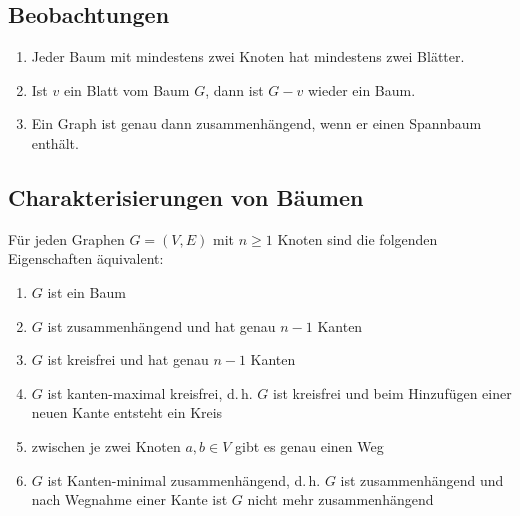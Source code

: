 \documentclass[%
a4paper, %
9pt,              %
leqno,            %
fleqn,            %
]
{scrartcl}
\begin{document}
\subsection*{Beobachtungen} %
\label{sub:Beobachtungen}

\begin{enumerate}
  \item Jeder Baum mit mindestens zwei Knoten hat mindestens zwei Blätter.
  \item Ist $v$ ein Blatt vom Baum $G$, dann ist $G-v$ wieder ein Baum.
  \item Ein Graph ist genau dann zusammenhängend, wenn er einen Spannbaum
    enthält.
\end{enumerate}


\subsection*{Charakterisierungen von Bäumen} %
\label{sub:Charakterisierungen von Bäumen}

Für jeden Graphen $G = (V,E)$ mit $n \geq 1$ Knoten sind die folgenden
Eigenschaften äquivalent:
\begin{enumerate}
  \item $G$ ist ein Baum
  \item $G$ ist zusammenhängend und hat genau $n-1$ Kanten
  \item $G$ ist kreisfrei und hat genau $n-1$ Kanten
  \item $G$ ist kanten-maximal kreisfrei, d.\,h. $G$ ist kreisfrei und beim
    Hinzufügen einer neuen Kante entsteht ein Kreis
  \item zwischen je zwei Knoten $a,b \in V$ gibt es genau einen Weg
  \item $G$ ist Kanten-minimal zusammenhängend, d.\,h. $G$ ist zusammenhängend
    und nach Wegnahme einer Kante ist $G$ nicht mehr zusammenhängend
\end{enumerate}


\end{document}
